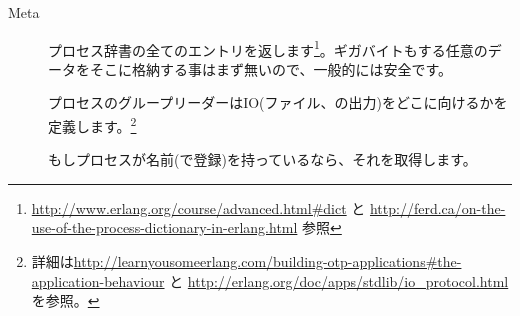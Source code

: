 \begin{description*}
	\item[Meta] \hfill
		\begin{description}		
      \item[] プロセス辞書の全てのエントリを返します\footnote{\href{http://www.erlang.org/course/advanced.html\#dict}{http://www.erlang.org/course/advanced.html\#dict} と \href{http://ferd.ca/on-the-use-of-the-process-dictionary-in-erlang.html}{http://ferd.ca/on-the-use-of-the-process-dictionary-in-erlang.html} 参照}。ギガバイトもする任意のデータをそこに格納する事はまず無いので、一般的には安全です。

			\item[] プロセスのグループリーダーはIO(ファイル、の出力)をどこに向けるかを定義します。\footnote{詳細は\href{http://learnyousomeerlang.com/building-otp-applications\#the-application-behaviour}{http://learnyousomeerlang.com/building-otp-applications\#the-application-behaviour} と \href{http://erlang.org/doc/apps/stdlib/io\_protocol.html}{http://erlang.org/doc/apps/stdlib/io\_protocol.html} を参照。}

			\item[] もしプロセスが名前(で登録)を持っているなら、それを取得します。


\end{description}
\end{description*}
